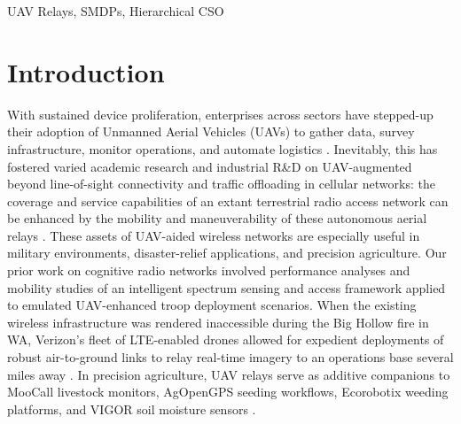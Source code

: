 \documentclass[10pt, twocolumn]{IEEEtran}
\theoremstyle{plain}
\theoremstyle{definition}
\theoremstyle{remark}
\begin{document}
\begin{IEEEkeywords}

UAV Relays, SMDPs, Hierarchical CSO

\end{IEEEkeywords}
\vspace{-4mm}

\section{Introduction}\label{S1}

With sustained device proliferation, enterprises across sectors have stepped-up their adoption of Unmanned Aerial Vehicles (UAVs) to gather data, survey infrastructure, monitor operations, and automate logistics \cite{UAVSurvey, UAVTutorial}. Inevitably, this has fostered varied academic research and industrial R\&D on UAV-augmented beyond line-of-sight connectivity and traffic offloading in cellular networks: the coverage and service capabilities of an extant terrestrial radio access network can be enhanced by the mobility and maneuverability of these autonomous aerial relays \cite{LOSDominance, FundamentalTradeoffs}. These assets of UAV-aided wireless networks are especially useful in military environments, disaster-relief applications, and precision agriculture. Our prior work on cognitive radio networks \cite{TCCN} involved performance analyses and mobility studies of an intelligent spectrum sensing and access framework applied to emulated UAV-enhanced troop deployment scenarios. When the existing wireless infrastructure was rendered inaccessible during the Big Hollow fire in WA, Verizon's fleet of LTE-enabled drones allowed for expedient deployments of robust air-to-ground links to relay real-time imagery to an operations base several miles away \cite{VerizonDisasterRelief}. In precision agriculture, UAV relays serve as additive companions to MooCall livestock monitors, AgOpenGPS seeding workflows, Ecorobotix weeding platforms, and VIGOR soil moisture sensors \cite{VerizonAgriculture}.
\end{document}
